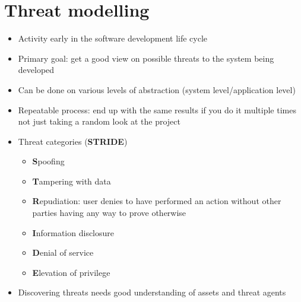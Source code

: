 \documentclass[12pt,titlepage,a4paper]{report}
\begin{document}
		\section{Threat modelling}
			\begin{itemize}
				\item Activity early in the software development life cycle
				\item Primary goal: get a good view on possible threats to the system being developed
				\item Can be done on various levels of abstraction (system level/application level)
				\item Repeatable process: end up with the same results if you do it multiple times
					\subitem not just taking a random look at the project
			\end{itemize}
			\begin{itemize}
				\item Threat categories (\textbf{STRIDE})
				\begin{itemize}
					\item \textbf{S}poofing
					\item \textbf{T}ampering with data
					\item \textbf{R}epudiation{\scriptsize: user denies to have performed an action without other parties having any way to prove otherwise}
					\item \textbf{I}nformation disclosure
					\item \textbf{D}enial of service
					\item \textbf{E}levation of privilege
				\end{itemize}
				\item Discovering threats needs good understanding of assets and threat agents
			\end{itemize}
\end{document}
